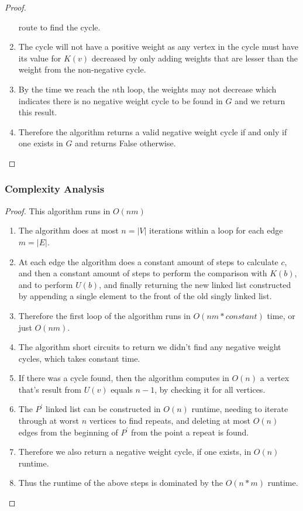 \documentclass{article}
\begin{document}
\begin{proof}
\begin{enumerate}
                  route to find the cycle.
            \item The cycle will not have a positive weight as any vertex in the cycle
                  must have its value for \(K(v)\) decreased by only adding weights that are
                  lesser than the weight from the non-negative cycle.
            \item By the time we reach the \(n\)th loop, the weights may not decrease
                  which indicates there is no negative weight cycle to be found in \(G\) and we
                  return this result.
            \item Therefore the algorithm returns a valid negative weight cycle if and
                  only if one exists in \(G\) and returns False otherwise.
      \end{enumerate}
\end{proof}

\subsubsection{Complexity Analysis}
\begin{proof} This algorithm runs in \(O(nm)\)
      \begin{enumerate}
            \item The algorithm does at most \(n = |V|\) iterations within a loop for each edge \(m = |E|\).
            \item At each edge the algorithm does a constant amount of steps to calculate \(c\), and then a
                  constant amount of steps to perform the comparison with \(K(b)\), and to perform
                  \(U(b)\), and finally returning the new linked list constructed by appending a single
                  element to the front of the old singly linked list.
            \item Therefore the first loop of the algorithm runs in \(O(nm * constant)\) time, or just \(O(nm)\).
            \item The algorithm short circuits to return we didn't find any negative weight
                  cycles, which takes constant time.
            \item If there was a cycle found, then the algorithm computes in \(O(n)\) a vertex
                  that's result from \(U(v)\) equals \(n-1\), by checking it for all vertices.
            \item The \(P^{\prime}\) linked list can be constructed in \(O(n)\) runtime, needing to iterate through at
                  worst \(n\) vertices to find repeats, and deleting at most \(O(n)\) edges from the
                  beginning of \(P^{\prime}\) from the point a repeat is found.
            \item Therefore we also return a negative weight cycle, if one exists, in \(O(n)\)
                  runtime.
            \item Thus the runtime of the above steps is dominated by the \(O(n*m)\) runtime.
      \end{enumerate}
\end{proof}
\newpage
\end{document}
